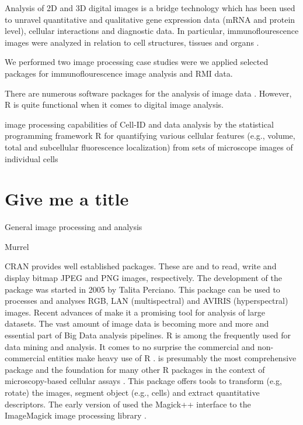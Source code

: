 Analysis of 2D and 3D digital images is a bridge technology which has been used 
to unravel quantitative and qualitative gene expression data (mRNA and protein 
level), cellular interactions and diagnostic data. In particular, 
immunoflourescence images were analyzed in relation to cell structures, tissues 
and organs \citep{chieco_image_2013, rodiger_highly_2013, 
schierack_species-specific_2014, willitzki_new_2012}.

We performed two image processing case studies were we applied selected 
packages for immunoflourescence image analysis and RMI data. 

There are numerous software packages for the analysis of image data 
\citep{wiesmann_review_2015}. However, R is quite functional when it comes to 
digital image analysis.

image processing capabilities of Cell-ID and data analysis by the statistical 
programming framework R for quantifying various cellular features (e.g., volume, 
total and subcellular fluorescence localization) from sets of microscope 
images of individual cells \citep{bush_using_2012}


\section{Give me a title}

General image processing and analysis


\citep{tabelow_modeling_2012, tabelow_dti:_2014}

Murrel \citep{murrell_raster_2011}
 \citep{clayden_mmand:_2016}

CRAN provides well established packages. These are  
\citep{urbanek_jpeg:_2014} and  \citep{urbanek_png:_2013} to 
read, write and display bitmap JPEG and PNG images, respectively. The 
development of the  \citep{perciano_ripa:_2014} package was started in 2005 by Talita Perciano. 
This package can be used to processes and analyses RGB, LAN (multispectral) 
and AVIRIS (hyperspectral) images. Recent advances of  make it a promising 
tool for analysis of large datasets. The vast amount of image data is becoming 
more and more and essential part of Big Data analysis pipelines. R is among 
the frequently used for data mining and analysis. It comes to no surprise the 
commercial and non-commercial entities make heavy use of R \citep{chen_big_2014}.  \citep{pau_ebimager_2010} 
is presumably the most comprehensive package and the foundation for many other 
R packages in the context of microscopy-based cellular assays \citep{gowen_near_2015}. This 
package offers tools to transform (e.g, rotate) the images, segment object 
(e.g., cells) and extract quantitative descriptors. The early version of 
 used the Magick++ interface to the ImageMagick image processing 
library \citep{sklyar_image_2006}.

